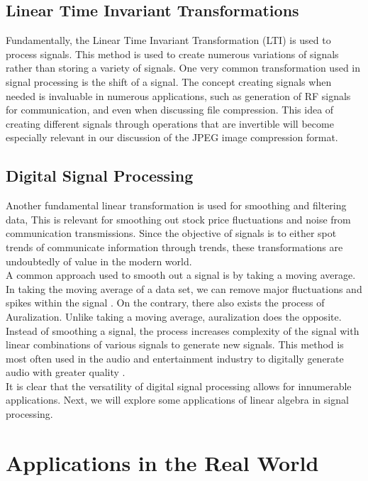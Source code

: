 \documentclass[11pt]{article}
\begin{document}
\subsection{Linear Time Invariant Transformations}

Fundamentally, the Linear Time Invariant Transformation (LTI) is used to process signals. This method is used to create numerous variations of signals rather than storing a variety of signals. One very common transformation used in signal processing is the shift of a signal. The concept creating signals when needed is invaluable in numerous applications, such as generation of RF signals for communication, and even when discussing file compression. This idea of creating different signals through operations that are invertible will become especially relevant in our discussion of the JPEG image compression format.

\subsection{Digital Signal Processing}

Another fundamental linear transformation is used for smoothing and filtering data, This is relevant for smoothing out stock price fluctuations and noise from communication transmissions. Since the objective of signals is to either spot trends of communicate information through trends, these transformations are undoubtedly of value in the modern world.\\

A common approach used to smooth out a signal is by taking a moving average. In taking the moving average of a data set, we can remove major fluctuations and spikes within the signal \cite{book:lay}. On the contrary, there also exists the process of Auralization. Unlike taking a moving average, auralization does the opposite. Instead of smoothing a signal, the process increases complexity of the signal with linear combinations of various signals to generate new signals. This method is most often used in the audio and entertainment industry to digitally generate audio with greater quality \cite{book:lay}.\\

It is clear that the versatility of digital signal processing allows for innumerable applications. Next, we will explore some applications of linear algebra in signal processing.

\section{Applications in the Real World}
\end{document}
